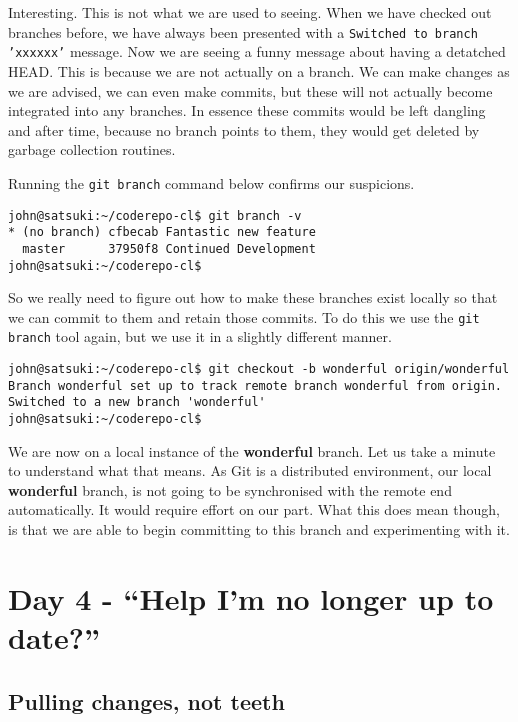 Interesting.  This is not what we are used to seeing.  When we have checked out branches before, we have always been presented with a \texttt{Switched to branch 'xxxxxx'} message.  Now we are seeing a funny message about having a detatched HEAD.  This is because we are not actually on a branch.  We can make changes as we are advised, we can even make commits, but these will not actually become integrated into any branches.  In essence these commits would be left dangling and after time, because no branch points to them, they would get deleted by garbage collection routines.

Running the \texttt{git branch} command below confirms our suspicions.

\begin{Verbatim}[frame=leftline,framerule=1mm,fontsize=\relsize{-3}] 
john@satsuki:~/coderepo-cl$ git branch -v
* (no branch) cfbecab Fantastic new feature
  master      37950f8 Continued Development
john@satsuki:~/coderepo-cl$ 
\end{Verbatim}

So we really need to figure out how to make these branches exist locally so that we can commit to them and retain those commits.  To do this we use the \texttt{git branch} tool again, but we use it in a slightly different manner.  

\begin{Verbatim}[frame=leftline,framerule=1mm,fontsize=\relsize{-3}] 
john@satsuki:~/coderepo-cl$ git checkout -b wonderful origin/wonderful 
Branch wonderful set up to track remote branch wonderful from origin.
Switched to a new branch 'wonderful'
john@satsuki:~/coderepo-cl$ 
\end{Verbatim}

We are now on a local instance of the \textbf{wonderful} branch.  Let us take a minute to understand what that means.  As Git is a distributed environment, our local \textbf{wonderful} branch, is not going to be synchronised with the remote end automatically.  It would require effort on our part.  What this does mean though, is that we are able to begin committing to this branch and experimenting with it.

\section{Day 4 - ``Help I'm no longer up to date?''}
\subsection{Pulling changes, not teeth}


